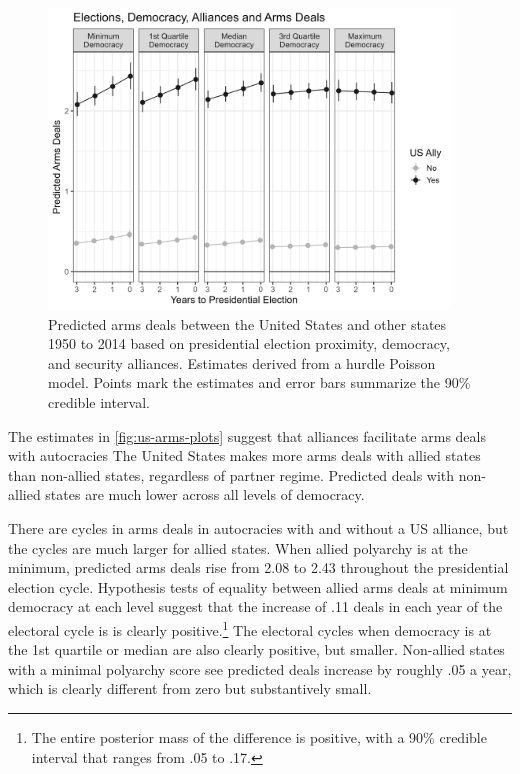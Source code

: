 \documentclass[12pt]{article}
\begin{document}
\begin{figure}[htpb]
	\centering
		\includegraphics[width=0.95\textwidth]{../figures/us-arms-plots.png}
	\caption{Predicted arms deals between the United States and other states 1950 to 2014 based on presidential election proximity, democracy, and security alliances. Estimates derived from a hurdle Poisson model. Points mark the estimates and error bars summarize the 90\% credible interval.}
	\label{fig:us-arms-plots}
\end{figure}


The estimates in \autoref{fig:us-arms-plots} suggest that alliances facilitate arms deals with autocracies
The United States makes more arms deals with allied states than non-allied states, regardless of partner regime. 
Predicted deals with non-allied states are much lower across all levels of democracy. 


There are cycles in arms deals in autocracies with and without a US alliance, but the cycles are much larger for allied states. 
When allied polyarchy is at the minimum, predicted arms deals rise from 2.08 to 2.43 throughout the presidential election cycle.
Hypothesis tests of equality between allied arms deals at minimum democracy at each level suggest that the increase of .11 deals in each year of the electoral cycle is is clearly positive.\footnote{The entire posterior mass of the difference is positive, with a 90\% credible interval that ranges from .05 to .17.}
The electoral cycles when democracy is at the 1st quartile or median are also clearly positive, but smaller.
Non-allied states with a minimal polyarchy score see predicted deals increase by roughly .05 a year, which is clearly different from zero but substantively small. 
\end{document}
